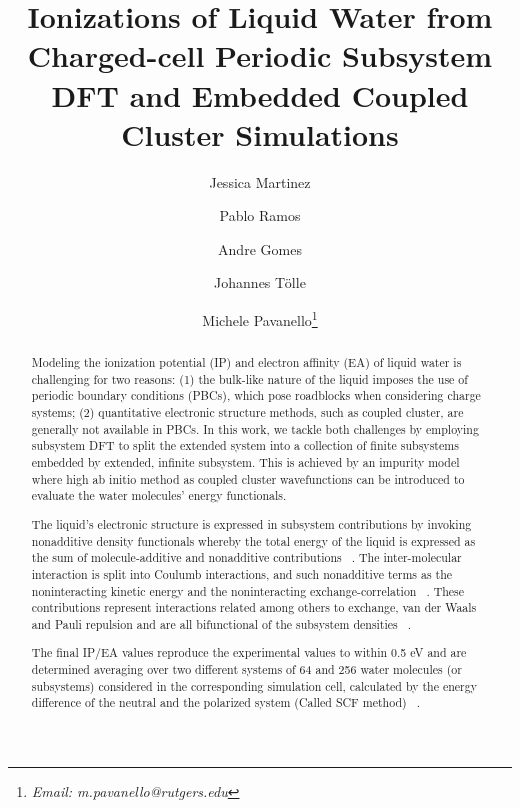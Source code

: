 \documentclass[12pt,a4paper]{article}
\begin{document}
\title{Ionizations of Liquid Water from Charged-cell Periodic Subsystem DFT and Embedded Coupled Cluster Simulations}
\author[1]{Jessica Martinez}
\author[1]{Pablo Ramos}
\author[2]{Andre Gomes}
\author[3]{Johannes Tölle}
\author[1]{Michele Pavanello\thanks{\textit{Email: m.pavanello@rutgers.edu}}}
\date{}
\setcounter{Maxaffil}{0}
\renewcommand\Affilfont{\itshape\small}
\begin{titlepage}
  \maketitle
\end{titlepage}

\begin{abstract}
Modeling the ionization potential (IP) and electron affinity (EA) of liquid water is challenging for
two reasons: (1) the bulk-like nature of the liquid imposes the use of periodic boundary conditions
(PBCs), which pose roadblocks when considering charge systems; (2) quantitative electronic structure
methods, such as coupled cluster, are generally not available in PBCs. In this work, we tackle both
challenges by employing subsystem DFT to split the extended system into a collection of finite
subsystems embedded by extended, infinite subsystem. This is achieved by an impurity
model ~\cite{tolle2019charged} where high ab initio method as coupled cluster wavefunctions can be introduced to evaluate
the water molecules’ energy functionals. 

The liquid’s electronic structure is expressed in subsystem contributions by invoking nonadditive density 
functionals whereby the total energy of the liquid is expressed as the sum of molecule-additive
and nonadditive contributions ~\cite{krishtal2015subsystem}. The inter-molecular interaction is
split into Coulumb interactions, and such nonadditive terms as the noninteracting
kinetic energy and the noninteracting exchange-correlation ~\cite{krishtal2015subsystem}. 
These contributions represent interactions related among others to exchange, van der Waals and
Pauli repulsion and are all bifunctional of the subsystem densities ~\cite{tolle2019charged}. 

The final IP/EA values reproduce the experimental values to within 0.5 eV and are determined averaging 
over two different systems of 64 and 256 water molecules (or subsystems) considered in the corresponding simulation cell,
calculated by the energy difference of the neutral and the polarized system (Called SCF method) 
~\cite{bagus1965self,waskom2017mwaskom}. 
\end{abstract}
\end{document}
